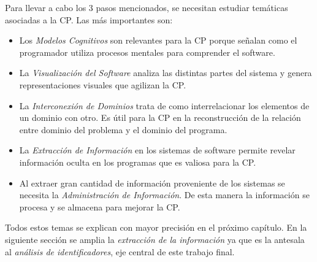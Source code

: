\documentclass[a4paper,12pt]{report}
\begin{document}
Para llevar a cabo los 3 pasos mencionados, se necesitan estudiar temáticas asociadas a la CP. Las más importantes son:

\begin{itemize}
\itemsep0em%
\item Los \textit{Modelos Cognitivos} son relevantes para la CP porque señalan como el programador utiliza procesos mentales para comprender el software.

\item La \textit{Visualización del Software} analiza las distintas partes del sistema y genera representaciones visuales que agilizan la CP.

\item La \textit{Interconexión de Dominios} trata de como interrelacionar los elementos de un dominio con otro. Es útil para la CP en la reconstrucción de la relación entre dominio del problema y el dominio del programa.

\item La \textit{Extracción de Información} en los sistemas de software permite revelar información oculta en los programas que es valiosa para la CP.

\item Al extraer gran cantidad de información proveniente de los sistemas se necesita la \textit{Administración de Información}. De esta manera la información se procesa y se almacena para mejorar la CP.

\end{itemize}

Todos estos temas se explican con mayor precisión en el próximo capítulo. En la siguiente sección se amplia la \textit{extracción de la información} ya que es la antesala al \textit{análisis de identificadores}, eje central de este trabajo final.



\end{document}

